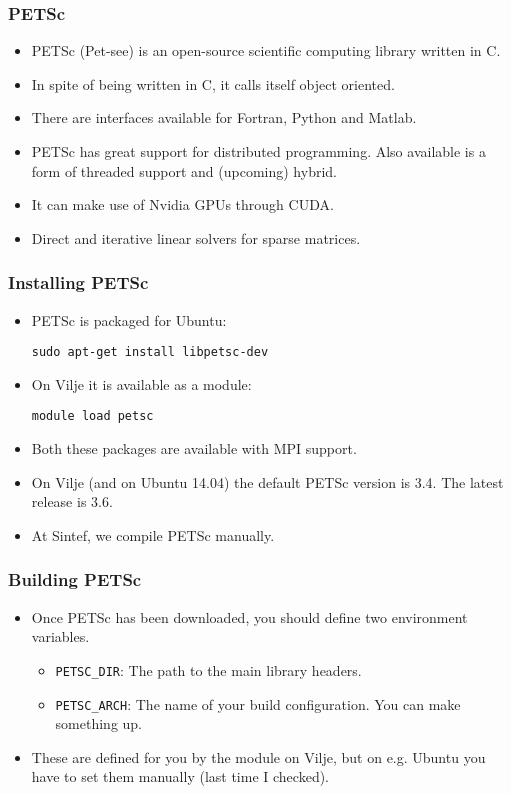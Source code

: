 \begin{frame}
  \frametitle{PETSc}
  \begin{itemize}
  \item PETSc (Pet-see) is an open-source scientific computing library written
    in C.
  \item In spite of being written in C, it calls itself object oriented.
  \item There are interfaces available for Fortran, Python and Matlab.
  \item PETSc has great support for distributed programming. Also available is a
    form of threaded support and (upcoming) hybrid.
  \item It can make use of Nvidia GPUs through CUDA.
  \item Direct and iterative linear solvers for sparse matrices.
  \end{itemize}
\end{frame}

\begin{frame}[fragile]
  \frametitle{Installing PETSc}
  \begin{itemize}
  \item PETSc is packaged for Ubuntu:
    \begin{lstlisting}[style=shell]
sudo apt-get install libpetsc-dev
    \end{lstlisting}
  \item On Vilje it is available as a module:
    \begin{lstlisting}[style=shell]
module load petsc
    \end{lstlisting}
  \item Both these packages are available with MPI support.
  \item On Vilje (and on Ubuntu 14.04) the default PETSc version is 3.4. The
    latest release is 3.6.
  \item At Sintef, we compile PETSc manually.
  \end{itemize}
\end{frame}

\begin{frame}[fragile]
  \frametitle{Building PETSc}
  \begin{itemize}
  \item Once PETSc has been downloaded, you should define two environment
    variables.
    \begin{itemize}
    \item \texttt{PETSC\_DIR}: The path to the main library headers.
    \item \texttt{PETSC\_ARCH}: The name of your build configuration. You can
      make something up.
    \end{itemize}
  \item These are defined for you by the module on Vilje, but on e.g. Ubuntu you
    have to set them manually (last time I checked).
  \end{itemize}
\end{frame}

